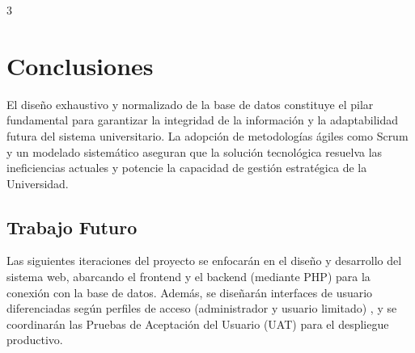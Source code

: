 \documentclass[a0,portrait]{a0poster}
\begin{document}
\begin{multicols}{3}


\section*{Conclusiones}

El diseño exhaustivo y normalizado de la base de datos constituye el pilar fundamental para garantizar la integridad de la información y la adaptabilidad futura del sistema universitario. La adopción de metodologías ágiles como Scrum y un modelado sistemático aseguran que la solución tecnológica resuelva las ineficiencias actuales y potencie la capacidad de gestión estratégica de la Universidad.

\subsection*{Trabajo Futuro}

Las siguientes iteraciones del proyecto se enfocarán en el diseño y desarrollo del sistema web, abarcando el frontend y el backend (mediante PHP) para la conexión con la base de datos. Además, se diseñarán interfaces de usuario diferenciadas según perfiles de acceso (administrador y usuario limitado) , y se coordinarán las Pruebas de Aceptación del Usuario (UAT) para el despliegue productivo.

\color{celeste}





\end{multicols}

\end{document}
